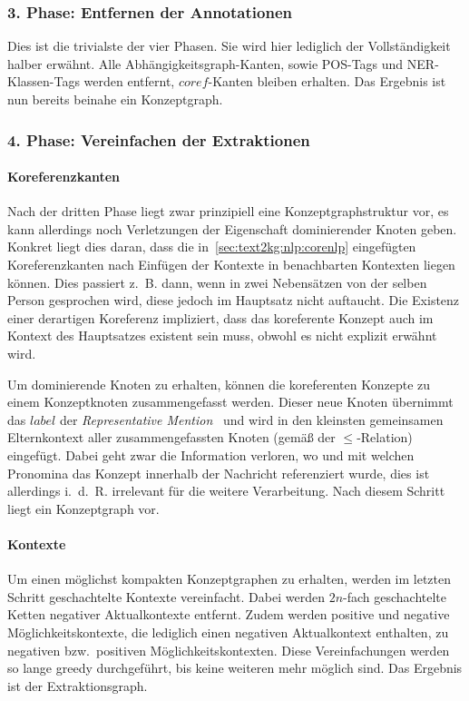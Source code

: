 \subsubsection{3. Phase: Entfernen der Annotationen}

Dies ist die trivialste der vier Phasen.
Sie wird hier lediglich der Vollständigkeit halber erwähnt.
Alle Abhängigkeitsgraph-Kanten, sowie POS-Tags und NER-Klassen-Tags werden entfernt, $coref$-Kanten bleiben erhalten.
Das Ergebnis ist nun bereits beinahe ein Konzeptgraph.

\subsubsection{4. Phase: Vereinfachen der Extraktionen}

\paragraph{Koreferenzkanten}
Nach der dritten Phase liegt zwar prinzipiell eine Konzeptgraphstruktur vor, es kann allerdings noch Verletzungen der Eigenschaft dominierender Knoten geben.
Konkret liegt dies daran, dass die in~\ref{sec:text2kg:nlp:corenlp} eingefügten Koreferenzkanten nach Einfügen der Kontexte in benachbarten Kontexten liegen können.
Dies passiert z.~B. dann, wenn in zwei Nebensätzen von der selben Person gesprochen wird, diese jedoch im Hauptsatz nicht auftaucht.
Die Existenz einer derartigen Koreferenz impliziert, dass das koreferente Konzept auch im Kontext des Hauptsatzes existent sein muss, obwohl es nicht explizit erwähnt wird.

Um dominierende Knoten zu erhalten, können die koreferenten Konzepte zu einem Konzeptknoten zusammengefasst werden.
Dieser neue Knoten übernimmt das $label$ der \textit{Representative Mention}~ und wird in den kleinsten gemeinsamen Elternkontext aller zusammengefassten Knoten (gemäß der $\leq$-Relation) eingefügt.
Dabei geht zwar die Information verloren, wo und mit welchen Pronomina das Konzept innerhalb der Nachricht referenziert wurde, dies ist allerdings i.~d.~R. irrelevant für die weitere Verarbeitung.
Nach diesem Schritt liegt ein Konzeptgraph vor.

\paragraph{Kontexte}
Um einen möglichst kompakten Konzeptgraphen zu erhalten, werden im letzten Schritt geschachtelte Kontexte vereinfacht.
Dabei werden $2n$-fach geschachtelte Ketten negativer Aktualkontexte entfernt.
Zudem werden positive und negative Möglichkeitskontexte, die lediglich einen negativen Aktualkontext enthalten, zu negativen bzw.\ positiven Möglichkeitskontexten.
Diese Vereinfachungen werden so lange greedy durchgeführt, bis keine weiteren mehr möglich sind.
Das Ergebnis ist der Extraktionsgraph.

